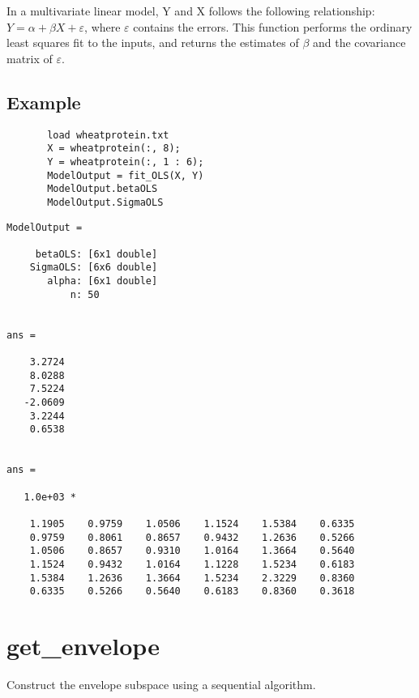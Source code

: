 \documentclass[a4paper,11pt,openany]{memoir}
\begin{document}
\begin{par}
In a multivariate linear model, Y and X follows the following relationship: $Y=\alpha+\beta X+\varepsilon$, where $\varepsilon$ contains the errors.  This function performs the ordinary least squares fit to the inputs, and returns the estimates of $\beta$ and the covariance matrix of $\varepsilon$.
\end{par} \vspace{1em}


\subsection*{Example}


\begin{verbatim}       load wheatprotein.txt
       X = wheatprotein(:, 8);
       Y = wheatprotein(:, 1 : 6);
       ModelOutput = fit_OLS(X, Y)
       ModelOutput.betaOLS
       ModelOutput.SigmaOLS\end{verbatim}
    
        \color{lightgray}\ttfamily \begin{verbatim}
ModelOutput = 

     betaOLS: [6x1 double]
    SigmaOLS: [6x6 double]
       alpha: [6x1 double]
           n: 50


ans =

    3.2724
    8.0288
    7.5224
   -2.0609
    3.2244
    0.6538


ans =

   1.0e+03 *

    1.1905    0.9759    1.0506    1.1524    1.5384    0.6335
    0.9759    0.8061    0.8657    0.9432    1.2636    0.5266
    1.0506    0.8657    0.9310    1.0164    1.3664    0.5640
    1.1524    0.9432    1.0164    1.1228    1.5234    0.6183
    1.5384    1.2636    1.3664    1.5234    2.3229    0.8360
    0.6335    0.5266    0.5640    0.6183    0.8360    0.3618

\end{verbatim} \rmfamily
\color{black}
    
\newpage

\rmfamily
\color{black}
\section{get\_envelope}

\begin{par}
Construct the envelope subspace using a sequential algorithm.
\end{par} \vspace{1em}
\end{document}
